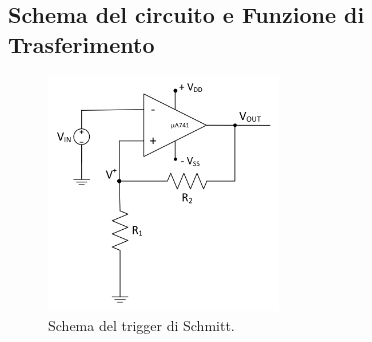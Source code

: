 \documentclass{report}
\begin{document}
\subsection{Schema del circuito e Funzione di Trasferimento}
\begin{figure}[h]
	\centering
	\includegraphics[height=6.2cm]{immagini/schema2}
	\caption{Schema del trigger di Schmitt.}
	\label{figura:schema2}
\end{figure}
\end{document}
